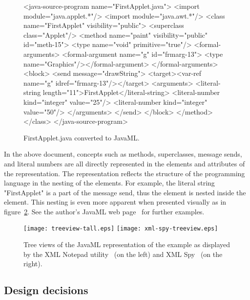 \documentclass{article}
\begin{document}
\begin{multicols}{2}
\begin{figure}[p]
\begin{listing}{1}
<java-source-program name="FirstApplet.java">
  <import module="java.applet.*"/>
  <import module="java.awt.*"/>
  <class name="FirstApplet" visibility="public">
    <superclass class="Applet"/>
    <method name="paint" visibility="public" id="meth-15">
      <type name="void" primitive="true"/>
      <formal-arguments>
         <formal-argument name="g" id="frmarg-13">
             <type name="Graphics"/></formal-argument>
      </formal-arguments>
      <block>
        <send message="drawString">
          <target><var-ref name="g" idref="frmarg-13"/></target>
            <arguments>
              <literal-string length="11">FirstApplet</literal-string>
              <literal-number kind="integer" value="25"/>
              <literal-number kind="integer" value="50"/>
            </arguments>
        </send>
      </block>
    </method>
  </class>
</java-source-program>
\end{listing}
\caption{FirstApplet.java converted to JavaML.
\label{fig-firstapplet-javaml}}
\end{figure}

In the above document, concepts such as methods, superclasses, message
sends, and literal numbers are all directly represented in the elements
and attributes of the representation.  The representation reflects the
structure of the programming language in the nesting of the elements.
For example, the literal string "FirstApplet" is a part of the message
send, thus the  element is nested inside the
 element.  This nesting is even more apparent when
presented visually as in figure~\ref{fig-treeview}. See
 the author's JavaML web page~\cite{Badros-javaml}
for further examples.

\begin{figure}[p]
\begin{centering}
\texttt{[image: treeview-tall.eps]}
\hspace*{.5in}
\texttt{[image: xml-spy-treeview.eps]}
\caption{Tree views of the JavaML representation 
of the  example as displayed by the 
XML Notepad utility~\cite{XMLNotepad} (on the left) and XML Spy~\cite{XMLSpy} (on the 
right).
\label{fig-treeview}}
\end{centering}
\end{figure}

\subsection{Design decisions}
\label{ssec-design}


\end{multicols}
\end{document}
